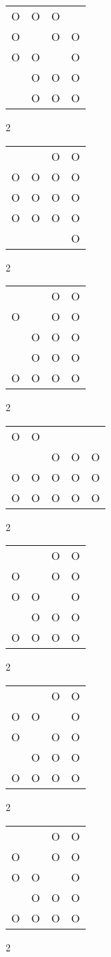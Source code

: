 \begin{tabular}{|m{0.2cm}m{0.2cm}m{0.2cm}m{0.2cm}|}\hline
O&O&O& \\
O& &O&O\\
O&O& &O\\
 &O&O&O\\
 &O&O&O\\
\hline\end{tabular}2
\begin{tabular}{|m{0.2cm}m{0.2cm}m{0.2cm}m{0.2cm}|}\hline
 & &O&O\\
O&O&O&O\\
O&O&O&O\\
O&O&O&O\\
 & & &O\\
\hline\end{tabular}2
\begin{tabular}{|m{0.2cm}m{0.2cm}m{0.2cm}m{0.2cm}|}\hline
 & &O&O\\
O& &O&O\\
 &O&O&O\\
 &O&O&O\\
O&O&O&O\\
\hline\end{tabular}2
\begin{tabular}{|m{0.2cm}m{0.2cm}m{0.2cm}m{0.2cm}m{0.2cm}|}\hline
O&O& & & \\
 & &O&O&O\\
O&O&O&O&O\\
O&O&O&O&O\\
\hline\end{tabular}2
\begin{tabular}{|m{0.2cm}m{0.2cm}m{0.2cm}m{0.2cm}|}\hline
 & &O&O\\
O& &O&O\\
O&O& &O\\
 &O&O&O\\
O&O&O&O\\
\hline\end{tabular}2
\begin{tabular}{|m{0.2cm}m{0.2cm}m{0.2cm}m{0.2cm}|}\hline
 & &O&O\\
O&O& &O\\
O& &O&O\\
 &O&O&O\\
O&O&O&O\\
\hline\end{tabular}2
\begin{tabular}{|m{0.2cm}m{0.2cm}m{0.2cm}m{0.2cm}|}\hline
 & &O&O\\
O& &O&O\\
O&O& &O\\
 &O&O&O\\
O&O&O&O\\
\hline\end{tabular}2
